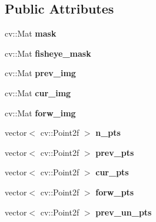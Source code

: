 \subsection*{Public Attributes}
\begin{DoxyCompactItemize}
\item 
\mbox{\label{classFeatureTracker_aa498ea1d93ed35fcba00ee40f6d653ee}} 
cv\+::\+Mat {\bfseries mask}
\item 
\mbox{\label{classFeatureTracker_ae1f00a40e97af8ea9f16aa0a0c1ef614}} 
cv\+::\+Mat {\bfseries fisheye\+\_\+mask}
\item 
\mbox{\label{classFeatureTracker_af418c09b742405b22bf459ac56fe65a7}} 
cv\+::\+Mat {\bfseries prev\+\_\+img}
\item 
\mbox{\label{classFeatureTracker_a8467a4503fbd44d5fef76c8c586bee0e}} 
cv\+::\+Mat {\bfseries cur\+\_\+img}
\item 
\mbox{\label{classFeatureTracker_a0fc6d38c9c617dadd9f8a48c0854b5c1}} 
cv\+::\+Mat {\bfseries forw\+\_\+img}
\item 
\mbox{\label{classFeatureTracker_ab26bf3c396369069a1a9c9fba76e1aee}} 
vector$<$ cv\+::\+Point2f $>$ {\bfseries n\+\_\+pts}
\item 
\mbox{\label{classFeatureTracker_ab6c950c1d6225a01c445ab4bbf5ecaa3}} 
vector$<$ cv\+::\+Point2f $>$ {\bfseries prev\+\_\+pts}
\item 
\mbox{\label{classFeatureTracker_a0a7518203319fd85e233b474f192da0c}} 
vector$<$ cv\+::\+Point2f $>$ {\bfseries cur\+\_\+pts}
\item 
\mbox{\label{classFeatureTracker_a212a6957e2c370e3a84e587da785c55e}} 
vector$<$ cv\+::\+Point2f $>$ {\bfseries forw\+\_\+pts}
\item 
\mbox{\label{classFeatureTracker_a6daca5f88421f164cfa1285332a52c8a}} 
vector$<$ cv\+::\+Point2f $>$ {\bfseries prev\+\_\+un\+\_\+pts}
\item 

\end{DoxyCompactItemize}
